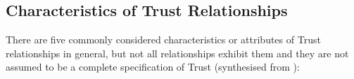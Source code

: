 

\subsection{Characteristics of Trust Relationships}

There are five commonly considered characteristics or attributes of Trust relationships in general, but not all relationships exhibit them and they are not assumed to be a complete specification of Trust (synthesised from \cite{Liu2006,Mayer1995, Mcknight1996, Pavan2015}):


